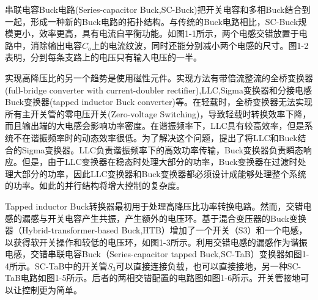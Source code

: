 串联电容Buck电路(Series-capacitor Buck,SC-Buck)把开关电容和多相Buck结合到一起，形成一种新的Buck电路的拓扑结构。与传统的Buck电路相比，SC-Buck规模更小，效率更高，具有电流自平衡功能。如图1-1所示，两个电感交错放置于电路中，消除输出电容$C_o$上的电流纹波，同时还能分别减小两个电感的尺寸。图1-2表明，分到每条支路上的电压只有输入电压的一半。


实现高降压比的另一个趋势是使用磁性元件。实现方法有带倍流整流的全桥变换器(full-bridge converter with current-doubler rectifier),LLC,Sigma变换器和分接电感Buck变换器(tapped inductor Buck converter)等。在轻载时，全桥变换器无法实现所有主开关管的零电压开关(Zero-voltage Switching)，导致轻载时转换效率下降，而且输出端的大电感会影响功率密度。在谐振频率下，LLC具有较高效率，但是系统不在谐振频率时的动态效率很低。为了解决这个问题，提出了将LLC和Buck结合的Sigma变换器。LLC负责谐振频率下的高效功率传输，Buck变换器负责瞬态响应。但是，由于LLC变换器在稳态时处理大部分的功率，Buck变换器在过渡时处理大部分的功率，因此LLC变换器和Buck变换器都必须设计成能够处理整个系统的功率。如此的并行结构将增大控制的复杂度。


Tapped inductor Buck转换器最初用于处理高降压比功率转换电路。然而，交错电感的漏感与开关电容产生共振，产生额外的电压环。基于混合变压器的Buck变换器（Hybrid-transformer-based Buck,HTB）增加了一个开关（S3）和一个电感，以获得软开关操作和较低的电压环，如图1-3所示。利用交错电感的漏感作为谐振电感，交错串联电容Buck（Series-capacitor tapped Buck,SC-TaB）变换器如图1-4所示。SC-TaB中的开关管$S_3$可以直接连接负载，也可以直接接地，另一种SC-TaB电路如图1-5所示。后者的两相交错配置的电路图如图1-6所示。开关管接地可以让控制更为简单。


